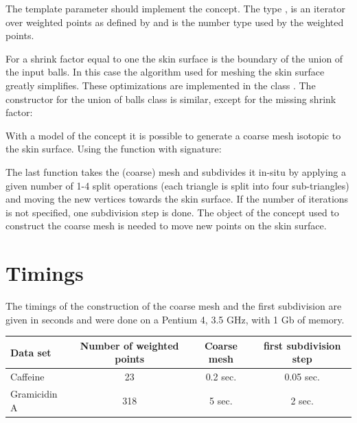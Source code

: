 
The template parameter should implement the 
concept. The type , is an iterator over weighted
points as defined by  and  is the
number type used by the weighted points.


For a shrink factor equal to one the skin surface is the boundary of
the union of the input balls. In this case the algorithm used for
meshing the skin surface greatly simplifies. These optimizations are
implemented in the class . The constructor for
the union of balls class is similar, except for the missing shrink
factor:


With a model of the concept  it is possible to
generate a coarse mesh isotopic to the skin surface. Using the
function  with signature:


The last function takes the (coarse) mesh and subdivides it in-situ by
applying a given number of 1-4 split operations (each triangle is
split into four sub-triangles) and moving the new vertices towards the
skin surface. If the number of iterations is not specified, one
subdivision step is done. The object of the 
concept used to construct the coarse mesh is needed to move new points
on the skin surface.


%

\section{Timings}
The timings of the construction of the coarse mesh and the first
subdivision are given in seconds and were done on a Pentium 4, 3.5
GHz, with 1 Gb of memory.
\begin{center}
  \begin{tabular}{|l|c|c|c|}
    \hline
    Data set & Number of weighted points & Coarse mesh & first subdivision step\\
    \hline
    \hline
    Caffeine& 23 & 0.2 sec. & 0.05 sec.\\
    Gramicidin A& 318 & 5 sec. & 2 sec.\\
    \hline
  \end{tabular}
\end{center}

